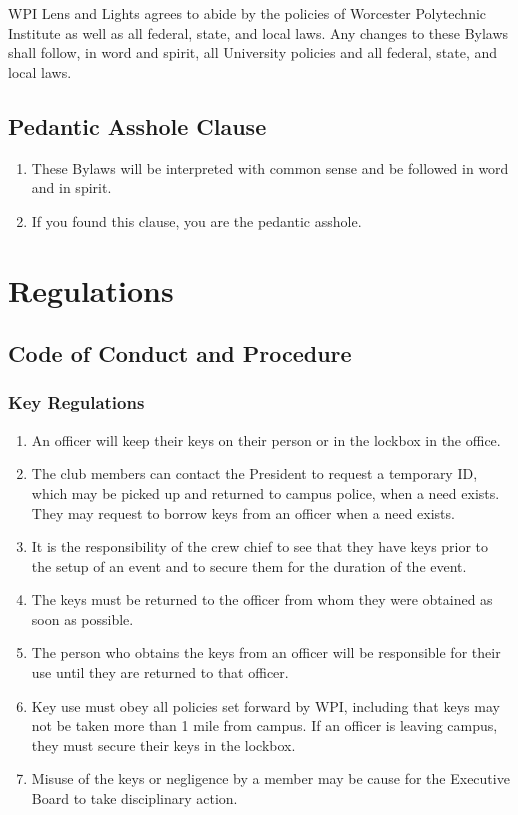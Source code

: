 \documentclass[12pt,letterpaper,oneside]{book}
\begin{document}
WPI Lens and Lights agrees to abide by the policies of Worcester Polytechnic Institute as well as all federal, state, and local laws. Any changes to these Bylaws shall follow, in word and spirit, all University policies and all federal, state, and local laws.

\chapter{Pedantic Asshole Clause}

\begin{enumerate}

\item These Bylaws will be interpreted with common sense and be followed in word and in spirit.
\item If you found this clause, you are the pedantic asshole.

\end{enumerate}

\part{Regulations}

\renewcommand{\chaptername}{Chapter}

\chapter{Code of Conduct and Procedure}

\section{Key Regulations}

\begin{enumerate}

\item An officer will keep their keys on their person or in the lockbox in the office.
\item The club members can contact the President to request a temporary ID, which may be picked up and returned to campus police, when a need exists. They may request to borrow keys from an officer when a need exists.
\item It is the responsibility of the crew chief to see that they have keys prior to the setup of an event and to secure them for the duration of the event.
\item The keys must be returned to the officer from whom they were obtained as soon as possible.
\item The person who obtains the keys from an officer will be responsible for their use until they are returned to that officer.
\item Key use must obey all policies set forward by WPI, including that keys may not be taken more than 1 mile from campus. If an officer is leaving campus, they must secure their keys in the lockbox.
\item Misuse of the keys or negligence by a member may be cause for the Executive Board to take disciplinary action.

\end{enumerate}
\end{document}
